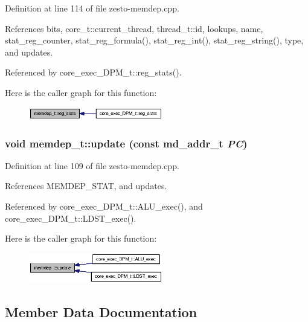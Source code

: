 Definition at line 114 of file zesto-memdep.cpp.

References bits, core\_\-t::current\_\-thread, thread\_\-t::id, lookups, name, stat\_\-reg\_\-counter, stat\_\-reg\_\-formula(), stat\_\-reg\_\-int(), stat\_\-reg\_\-string(), type, and updates.

Referenced by core\_\-exec\_\-DPM\_\-t::reg\_\-stats().

Here is the caller graph for this function:\nopagebreak
\begin{figure}[H]
\begin{center}
\leavevmode
\includegraphics[width=166pt]{classmemdep__t_a1a98010c0e6d4008ae372469db6888b_icgraph}
\end{center}
\end{figure}
\subsubsection[{update}]{\setlength{\rightskip}{0pt plus 5cm}void memdep\_\-t::update (const {\bf md\_\-addr\_\-t} {\em PC})\hspace{0.3cm}{\tt  [virtual]}}\label{classmemdep__t_61189c4dc4e8dbb5928f51a91d629f76}




Definition at line 109 of file zesto-memdep.cpp.

References MEMDEP\_\-STAT, and updates.

Referenced by core\_\-exec\_\-DPM\_\-t::ALU\_\-exec(), and core\_\-exec\_\-DPM\_\-t::LDST\_\-exec().

Here is the caller graph for this function:\nopagebreak
\begin{figure}[H]
\begin{center}
\leavevmode
\includegraphics[width=166pt]{classmemdep__t_61189c4dc4e8dbb5928f51a91d629f76_icgraph}
\end{center}
\end{figure}


\subsection{Member Data Documentation}
